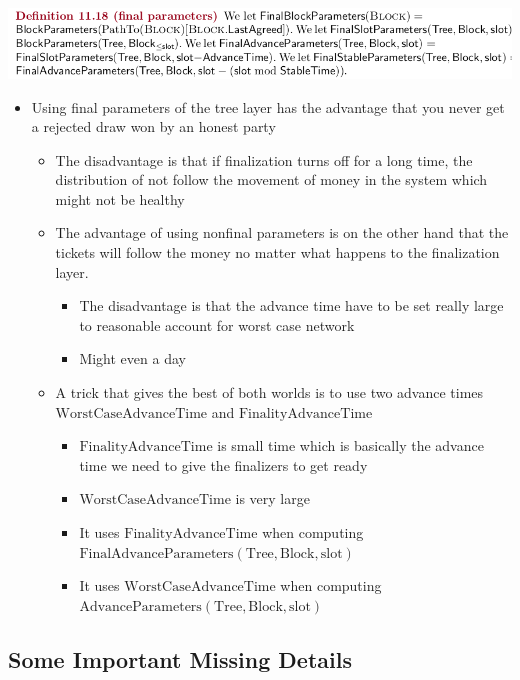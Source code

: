 \documentclass[11pt]{article}
\begin{document}
\begin{center}
\includegraphics[width=.9\linewidth]{Blockchains (11)/screenshot_2018-10-30_21-27-22.png}
\end{center}

\begin{itemize}
\item Using final parameters of the tree layer has the advantage that you never get a rejected draw won by an honest party
\begin{itemize}
\item The disadvantage is that if finalization turns off for a long time, the distribution of not follow the movement of money in the system which might not be healthy
\item The advantage of using nonfinal parameters is on the other hand that the tickets will follow the money no matter what happens to the finalization layer.
\begin{itemize}
\item The disadvantage is that the advance time have to be set really large to reasonable account for worst case network
\item Might even a day
\end{itemize}
\item A trick that gives the best of both worlds is to use two advance times \(\text{WorstCaseAdvanceTime}\) and \(\text{FinalityAdvanceTime}\)
\begin{itemize}
\item \(\text{FinalityAdvanceTime}\) is small time which is basically the advance time we need to give the finalizers to get ready
\item \(\text{WorstCaseAdvanceTime}\) is very large
\item It uses \(\text{FinalityAdvanceTime}\) when computing \(\text{FinalAdvanceParameters}(\text{Tree}, \text{Block}, \text{slot})\)
\item It uses  \(\text{WorstCaseAdvanceTime}\) when computing \(\text{AdvanceParameters}(\text{Tree}, \text{Block}, \text{slot})\)
\end{itemize}
\end{itemize}
\end{itemize}

\subsection{Some Important Missing Details}
\label{sec:org4d8d61a}
\end{document}
